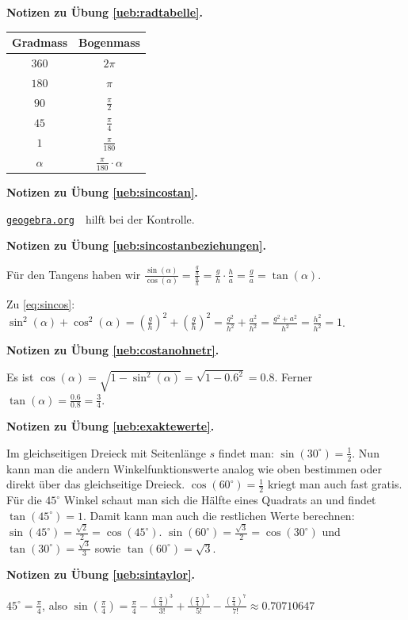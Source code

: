 \documentclass[%
11pt,%
twoside,%
titlepage,%
german,%
headsepline%
]{scrartcl}
\newcommand{\geogebralink}{\href{https://www.geogebra.org/calculator}{\texttt{geogebra.org}}}
\newcommand{\spaltenheight}{\rule{0mm}{3ex}}
\newcommand{\spaltensep}{\\[1ex]}
\newcommand{\concatueb}[1]{ueb:#1}%
\newcommand{\concatlsg}[1]{lsg:#1}%
\newenvironment{lsg}[1]{%
    \par\noindent\textbf{Notizen zu Übung \ref{\concatueb{#1}}.}%
    \label{\concatlsg{#1}}
}{%
    \par%
}
\begin{document}
\begin{lsg}{radtabelle}
\begin{center}
\small
\begin{tabular}{|c|c|}
\hline
\rowcolor{Gray}\spaltenheight \textbf{Gradmass} & \textbf{Bogenmass}\spaltensep\hline
\rowcolor{lightyellow}\spaltenheight $360$ & $2\pi$\spaltensep\hline
\rowcolor{Gray}\spaltenheight $180$ & $\pi$\spaltensep\hline
\rowcolor{lightyellow}\spaltenheight $90$ & $\frac{\pi}{2}$\spaltensep\hline
\rowcolor{Gray}\spaltenheight $45$ & $\frac{\pi}{4}$\spaltensep\hline
\rowcolor{lightyellow}\spaltenheight $1$ & $\frac{\pi}{180}$\spaltensep\hline
\rowcolor{Gray}\spaltenheight $\alpha$ & $\frac{\pi}{180}\cdot\alpha$\spaltensep\hline
\end{tabular}
\end{center}
\end{lsg}
\begin{lsg}{sincostan}
\geogebralink\ \ hilft bei der Kontrolle.
\end{lsg}
\begin{lsg}{sincostanbeziehungen}
Für den Tangens haben wir $\frac{\sin(\alpha)}{\cos(\alpha)}=\frac{\frac{g}{h}}{\frac{a}{h}}=\frac{g}{h}\cdot\frac{h}{a}=\frac{g}{a}=\tan(\alpha)$.

Zu \eqref{eq:sincos}: $\sin^{2}(\alpha)+\cos^{2}(\alpha)=\left(\frac{g}{h}\right)^{2}+\left(\frac{g}{h}\right)^{2}=\frac{g^{2}}{h^{2}}+\frac{a^{2}}{h^{2}}=\frac{g^{2}+a^{2}}{h^{2}}=\frac{h^{2}}{h^{2}}=1$.
\end{lsg}
\begin{lsg}{costanohnetr}
Es ist $\cos(\alpha)=\sqrt{1-\sin^{2}(\alpha)}=\sqrt{1-0.6^{2}}=0.8$. Ferner $\tan(\alpha)=\frac{0.6}{0.8}=\frac{3}{4}$.
\end{lsg}
\begin{lsg}{exaktewerte}
Im gleichseitigen Dreieck mit Seitenl\"ange $s$ findet man: $\sin(30^{\circ})=\frac{1}{2}$. Nun kann man die andern Winkelfunktionswerte analog wie oben bestimmen oder direkt \"uber das gleichseitige Dreieck. $\cos(60^{\circ})=\frac{1}{2}$ kriegt man auch fast gratis. F\"ur die $45^{\circ}$ Winkel schaut man sich die H\"alfte eines Quadrats an und findet $\tan(45^{\circ})=1$. Damit kann man auch die restlichen Werte berechnen: $\sin(45^{\circ})=\frac{\sqrt{2}}{2}=\cos(45^{\circ})$. $\sin(60^{\circ})=\frac{\sqrt{3}}{2}=\cos(30^{\circ})$ und $\tan(30^{\circ})=\frac{\sqrt{3}}{3}$ sowie $\tan(60^{\circ})=\sqrt{3}$.
\end{lsg}
\begin{lsg}{sintaylor}
$45^{\circ}=\frac{\pi}{4}$, also $\sin(\frac{\pi}{4})=\frac{\pi}{4}-\frac{(\frac{\pi}{4})^{3}}{3!}+\frac{(\frac{\pi}{4})^{5}}{5!}-\frac{(\frac{\pi}{4})^{7}}{7!}\approx0.70710647$
\end{lsg}
\end{document}
